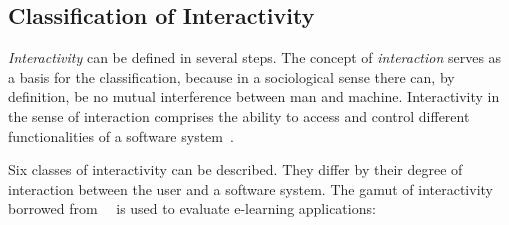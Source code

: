 \subsection{Classification of Interactivity}
\label{sec:elearn:interactivity}

\emph{Interactivity} can be defined in several steps. The concept of 
\emph{interaction} serves as a basis for the classification, because in a 
sociological sense there can, by definition, be no mutual interference
between man and machine. Interactivity in the sense of interaction comprises
the ability to access and control different functionalities of a software 
system~.

Six classes of interactivity can be described. They differ by their degree of
interaction between the user and a software system.
The gamut of interactivity
borrowed from~~\citeyear{Richert2007}
is used to evaluate e-learning applications:

